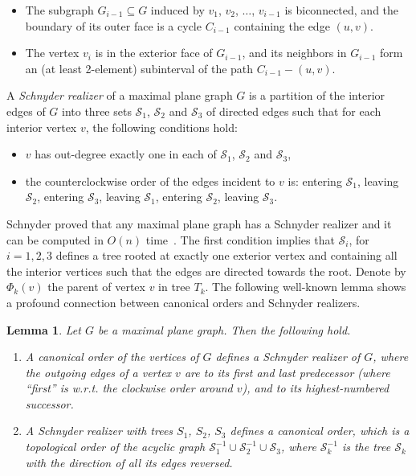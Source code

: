 \documentclass[11pt]{article}
\newtheorem{lemma}{Lemma}[section]
\begin{document}
\begin{itemize}
    \item The subgraph $G_{i-1}\subseteq G$ induced by $v_1$, $v_2$, $\ldots$, $v_{i-1}$ is
     biconnected, and the boundary of its outer face is a cycle $C_{i-1}$ containing the edge
     $(u, v)$.
    \item The vertex $v_i$ is in the exterior face of $G_{i-1}$, and its neighbors in $G_{i-1}$
    form an (at least 2-element) subinterval of the path $C_{i-1}-(u, v)$.
\end{itemize}


A \textit{Schnyder realizer} of a maximal plane graph $G$ is a partition of the interior
 edges of $G$ into three sets $\mathcal{S}_1$, $\mathcal{S}_2$ and $\mathcal{S}_3$ of
 directed edges such that for each interior vertex $v$, the following conditions hold:

\begin{itemize}
    \item $v$ has out-degree exactly one in each of $\mathcal{S}_1$, $\mathcal{S}_2$ and $\mathcal{S}_3$,
    \item the counterclockwise order of the edges incident to $v$ is: entering $\mathcal{S}_1$, leaving $\mathcal{S}_2$,
    entering $\mathcal{S}_3$, leaving $\mathcal{S}_1$, entering $\mathcal{S}_2$, leaving $\mathcal{S}_3$.
\end{itemize}

Schnyder proved that any maximal plane graph has a Schnyder realizer
and it can be computed in $O(n)$ time~\cite{s-epgg-90}. The first
condition implies that $\mathcal{S}_i$, for $i=1, 2, 3$ defines a tree rooted at exactly
 one exterior vertex and containing all the interior vertices such that the edges are directed towards the root.
 Denote by $\Phi_k(v)$ the parent of vertex $v$ in tree $T_k$.
The following well-known lemma shows a profound connection between canonical orders and Schnyder realizers.

\begin{lemma}
\label{lemma:can-schny} Let $G$ be a maximal plane graph. Then the following hold.
    \begin{enumerate}
        \item[(a)] A canonical order of the vertices of $G$ defines a Schnyder realizer of $G$, where the
            outgoing edges of a vertex $v$ are to its first and last predecessor (where ``first'' is
            w.r.t. the clockwise order around $v$), and to its highest-numbered successor.
        \item[(b)] A Schnyder realizer with trees $S_1$, $S_2$, $S_3$ defines a canonical order,
            which is a topological order of the acyclic graph $\mathcal{S}_1^{-1}\cup \mathcal{S}_2^{-1} \cup \mathcal{S}_3$,
            where $\mathcal{S}_k^{-1}$ is the tree $\mathcal{S}_k$ with the direction of all its edges reversed.
    \end{enumerate}
\end{lemma}
\end{document}
